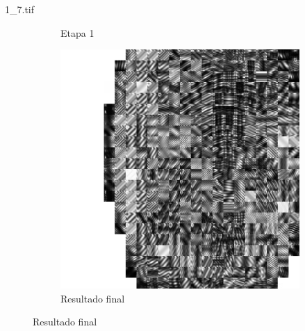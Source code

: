 \documentclass{beamer}
\begin{document}
\begin{frame}{1\_7.tif}
\begin{figure}
\begin{subfigure}[!ht]{0.32\textwidth}
                \caption{Etapa 1}
            \end{subfigure}
            \begin{subfigure}[!ht]{0.32\textwidth}
                \includegraphics[width=\columnwidth]{Fingerprints/1_7_final.jpg}
                \caption{Resultado final}
            \end{subfigure}
        \end{figure}
    \end{frame}
\end{document}
